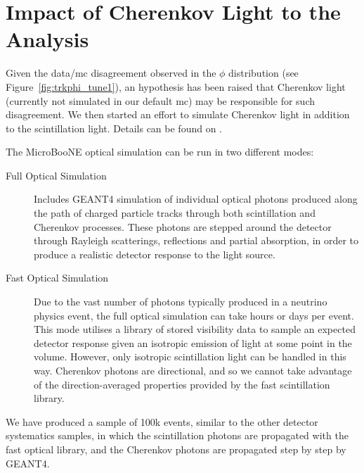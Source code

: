 \chapter{Impact of Cherenkov Light to the Analysis}
\label{ch:cherenkov}

Given the data/\acrshort{mc} disagreement observed in the $\phi$ distribution (see Figure~\ref{fig:trkphi_tune1}), an hypothesis has been raised that Cherenkov light (currently not simulated in our default \acrshort{mc}) may be responsible for such disagreement. We then started an effort to simulate Cherenkov light in addition to the scintillation light. Details can be found on \cite{deltutto_cherenkov}.

The MicroBooNE optical simulation can be run in two different modes:
\begin{description}
\item[Full Optical Simulation] Includes GEANT4 simulation of individual optical photons produced along the path of charged particle tracks through both scintillation and Cherenkov processes.
These photons are stepped around the detector through Rayleigh scatterings, reflections and partial absorption, in order to produce a realistic detector response to the light source. 
\item[Fast Optical Simulation] Due to the vast number of photons typically produced in a neutrino physics event, the full optical simulation can take hours or days per event. 
This mode utilises a library of stored visibility data to sample an expected detector response given an isotropic emission of light at some point in the volume. 
However, only isotropic scintillation light can be handled in this way. Cherenkov photons are directional, and so we cannot take advantage of the direction-averaged properties provided by the fast scintillation library. 
\end{description}

We have produced a sample of 100k events, similar to the other detector systematics samples, in which the scintillation photons are propagated with the fast optical library, and the Cherenkov photons are propagated step by step by GEANT4.

